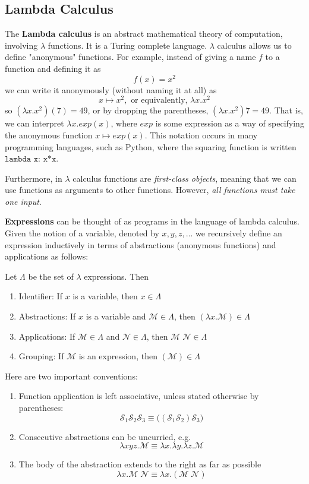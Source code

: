 \documentclass{article}
\begin{document}
  \subsection{Lambda Calculus}
  The \textbf{Lambda calculus} is an abstract mathematical theory of computation, involving $\lambda$ functions. It is a Turing complete language. $\lambda$ calculus allows us to define "anonymous" functions. For example, instead of giving a name $f$ to a function and defining it as 
  \[f(x) = x^2\]
  we can write it anonymously (without naming it at all) as 
  \[x \mapsto x^2, \text{ or equivalently, } \lambda x . x^2\]
  so $(\lambda x.x^2) (7) = 49$, or by dropping the parentheses,  $(\lambda x.x^2) 7 = 49$. That is, we can interpret $\lambda x.exp(x)$, where $exp$ is some expression as a way of specifying the anonymous function $x \mapsto exp(x)$. This notation occurs in many programming languages, such as Python, where the squaring function is written $\texttt{lambda x: x*x}$.  

  Furthermore, in $\lambda$ calculus functions are \textit{first-class objects}, meaning that we can use functions as arguments to other functions. However, \textit{all functions must take one input}. 

  \textbf{Expressions} can be thought of as programs in the language of lambda calculus. Given the notion of a variable, denoted by $x, y, z, ...$ we recursively define an expression inductively in terms of abstractions (anonymous functions) and applications as follows: 

  \begin{definition}
  Let $\Lambda$ be the set of $\lambda$ expressions. Then 
  \begin{enumerate}
      \item Identifier: If $x$ is a variable, then $x \in \Lambda$ 
      \item Abstractions: If $x$ is a variable and $\mathcal{M} \in \Lambda$, then $(\lambda x.\mathcal{M}) \in \Lambda$
      \item Applications: If $\mathcal{M} \in \Lambda$ and $\mathcal{N} \in \Lambda$, then $\mathcal{M}\;\mathcal{N} \in \Lambda$
      \item Grouping: If $\mathcal{M}$ is an expression, then $( \mathcal{M}) \in \Lambda$
  \end{enumerate}
  Here are two important conventions: 
  \begin{enumerate}
      \item Function application is left associative, unless stated otherwise by parentheses:
      \[\mathcal{S}_1 \mathcal{S}_2 \mathcal{S}_3 \equiv \big( (\mathcal{S}_1 \mathcal{S}_2) \mathcal{S}_3 \big)\]
      \item Consecutive abstractions can be uncurried, e.g. 
      \[\lambda x y z . \mathcal{M} \equiv \lambda x . \lambda y . \lambda z . \mathcal{M} \]
      \item The body of the abstraction extends to the right as far as possible 
      \[\lambda x . \mathcal{M} \; \mathcal{N} \equiv \lambda x . ( \mathcal{M}\; \mathcal{N})\]
  \end{enumerate}
  \end{definition}
\end{document}
